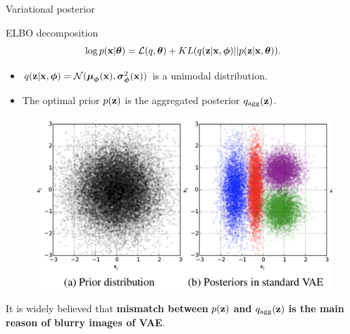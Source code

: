\begin{frame}{Variational posterior}
	\vspace{-0.3cm}
	\begin{block}{ELBO decomposition}
		\vspace{-0.3cm}
		\[
			\log p(\mathbf{x} | \boldsymbol{\theta}) = \mathcal{L}(q, \boldsymbol{\theta}) + KL(q(\mathbf{z} | \mathbf{x}, \boldsymbol{\phi}) || p(\mathbf{z} | \mathbf{x}, \boldsymbol{\theta})).
		\]
		\vspace{-0.7cm}
	\end{block}
	\begin{itemize}
		\item $q(\mathbf{z} | \mathbf{x}, \boldsymbol{\phi}) = \mathcal{N}(\boldsymbol{\mu}_{\boldsymbol{\phi}}(\mathbf{x}), \boldsymbol{\sigma}^2_{\boldsymbol{\phi}}(\mathbf{x}))$ is a unimodal distribution. 
		\item The optimal prior $p(\mathbf{z})$ is the aggregated posterior $q_{\text{agg}}(\mathbf{z})$.
	\end{itemize}
	
	\vspace{-0.3cm}
	\begin{figure}
		\includegraphics[width=0.65\linewidth]{figs/agg_posterior}
	\end{figure}
	\vspace{-0.3cm}
	It is widely believed that \textbf{mismatch between} $p(\mathbf{z})$  \textbf{and} $q_{\text{agg}}(\mathbf{z})$  \textbf{is the main reason of blurry images of VAE}.
\end{frame}
